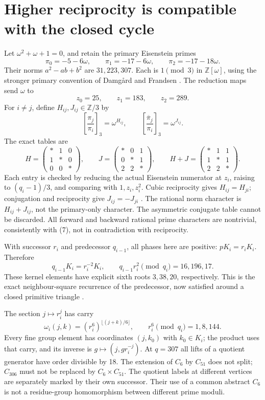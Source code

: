 \section{Higher reciprocity is compatible with the closed cycle}
Let $\omega^2+\omega+1=0$, and retain the primary Eisenstein primes
\[
 \pi_0=-5-6\omega,\qquad \pi_1=-17-6\omega,
 \qquad\pi_2=-17-18\omega.                               \tag{13}
\]
Their norms $a^2-ab+b^2$ are $31,223,307$. Each is $1\pmod3$ in
$\mathbb Z[\omega]$, using the stronger primary convention of Damg\aa rd and
Frandsen \cite[\S2, p.4]{DF}. The reduction maps send $\omega$ to
\[
 z_0=25,\qquad z_1=183,\qquad z_2=289.
\]
For $i\ne j$, define $H_{ij},J_{ij}\in\mathbb Z/3$ by
\[
 \left[\frac{\pi_j}{\pi_i}\right]_3=\omega^{H_{ij}},\qquad
 \left[\frac{\overline\pi_j}{\pi_i}\right]_3=\omega^{J_{ij}}.
\]
The exact tables are
\[
 H=\begin{pmatrix}*&1&0\\1&*&0\\0&0&*\end{pmatrix},\qquad
 J=\begin{pmatrix}*&0&1\\0&*&1\\2&2&*\end{pmatrix},\qquad
 H+J=\begin{pmatrix}*&1&1\\1&*&1\\2&2&*\end{pmatrix}.     \tag{14}
\]
Each entry is checked by reducing the actual Eisenstein numerator at $z_i$,
raising to $(q_i-1)/3$, and comparing with $1,z_i,z_i^2$. Cubic reciprocity gives
$H_{ij}=H_{ji}$; conjugation and reciprocity give $J_{ij}=-J_{ji}$
\cite[\S4, p.8]{DF}. The rational norm character is $H_{ij}+J_{ij}$, not the
primary-only character. The asymmetric conjugate table cannot be discarded.
All forward and backward rational prime characters are nontrivial, consistently
with (7), not in contradiction with reciprocity.

With successor $r_i$ and predecessor $q_{i-1}$, all phases here are positive:
$pK_i=r_iK_i$. Therefore
\[
 q_{i-1}K_i=r_i^{-2}K_i,\qquad
 q_{i-1}r_i^2\pmod{q_i}=16,196,17.                       \tag{15}
\]
These kernel elements have explicit sixth roots $3,38,20$, respectively.
This is the exact neighbour-square recurrence of the predecessor, now satisfied
around a closed primitive triangle \cite[\S3]{BryanChain}.

The section $j\mapsto r_i^j$ has carry
\[
 \omega_i(j,k)=(r_i^6)^{\lfloor(j+k)/6\rfloor},\qquad
 r_i^6\pmod{q_i}=1,8,144.                                \tag{16}
\]
Every fine group element has coordinates $(j,k_0)$ with $k_0\in K_i$; the product
uses that carry, and its inverse is $g\mapsto(j,gr_i^{-j})$. At $q=307$ all lifts
of a quotient generator have order divisible by 18. The extension of $C_6$ by
$C_{51}$ does not split; $C_{306}$ must not be replaced by $C_6\times C_{51}$.
The quotient labels at different vertices are separately marked by their own
successor. Their use of a common abstract $C_6$ is not a residue-group
homomorphism between different prime moduli.

